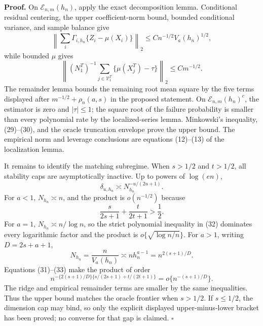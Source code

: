 \textbf{Proof.}
On \(\mathcal E_{n,m}(h_n)\), apply the exact decomposition lemma.  Conditional residual centering, the upper coefficient-norm bound, bounded conditional variance, and sample balance give
\[
 \left\|\sum_i\Gamma_{i,h_n}\{Z_i-\mu(X_i)\}\right\|_2
 \le Cn^{-1/2}V_a(h_n)^{1/2},
\tag{29}
\]
while bounded \(\mu\) gives
\[
 \left\|(N^T_1)^{-1}\sum_{j\in\mathcal V^T_1}
 \{\mu(X_j^T)-\tau\}\right\|_2\le Cm^{-1/2}.
\tag{30}
\]
The remainder lemma bounds the remaining root mean square by the five terms displayed after \(m^{-1/2}+\rho_n(a,s)\) in the proposed statement.  On \(\mathcal E_{n,m}(h_n)^c\), the estimator is zero and \(|\tau|\le1\); the square root of the failure probability is smaller than every polynomial rate by the localized-series lemma.  Minkowski's inequality, (29)--(30), and the oracle truncation envelope prove the upper bound.  The empirical norm and leverage conclusions are equations (12)--(13) of the localization lemma.

It remains to identify the matching subregime.  When \(s>1/2\) and \(t>1/2\), all stability caps are asymptotically inactive.  Up to powers of \(\log(en)\),
\[
 \delta_{u,h_n}\asymp N_{h_n}^{-u/(2u+1)}.
\tag{31}
\]
For \(a<1\), \(N_{h_n}\asymp n\), and the product is \(o(n^{-1/2})\) because
\[
 \frac{s}{2s+1}+\frac{t}{2t+1}>\frac12.
\tag{32}
\]
For \(a=1\), \(N_{h_n}\asymp n/\log n\), so the strict polynomial inequality in (32) dominates every logarithmic factor and the product is \(o\{\sqrt{\log n/n}\}\).  For \(a>1\), writing \(D=2s+a+1\),
\[
 N_{h_n}=\frac{n}{V_a(h_n)}\asymp nh_n^{a-1}
 =n^{2(s+1)/D}.
\tag{33}
\]
Equations (31)--(33) make the product of order
\[
 n^{-\{2(s+1)/D\}\{s/(2s+1)+t/(2t+1)\}}
 =o\{n^{-(s+1)/D}\}.
\tag{34}
\]
The ridge and empirical remainder terms are smaller by the same inequalities.  Thus the upper bound matches the oracle frontier when \(s>1/2\).  If \(s\le1/2\), the dimension cap may bind, so only the explicit displayed upper-minus-lower bracket has been proved; no converse for that gap is claimed. \(\square\)